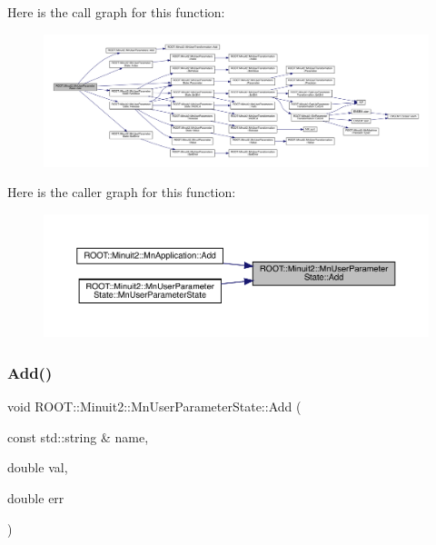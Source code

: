 Here is the call graph for this function\+:\nopagebreak
\begin{figure}[H]
\begin{center}
\leavevmode
\includegraphics[width=350pt]{d3/de0/classROOT_1_1Minuit2_1_1MnUserParameterState_a958abf8c6542ba9be16e298ad2b63001_cgraph}
\end{center}
\end{figure}
Here is the caller graph for this function\+:\nopagebreak
\begin{figure}[H]
\begin{center}
\leavevmode
\includegraphics[width=350pt]{d3/de0/classROOT_1_1Minuit2_1_1MnUserParameterState_a958abf8c6542ba9be16e298ad2b63001_icgraph}
\end{center}
\end{figure}
\mbox{\label{classROOT_1_1Minuit2_1_1MnUserParameterState_a958abf8c6542ba9be16e298ad2b63001}} 
\subsubsection{\texorpdfstring{Add()}{Add()}\hspace{0.1cm}{\footnotesize\ttfamily [2/6]}}
{\footnotesize\ttfamily void R\+O\+O\+T\+::\+Minuit2\+::\+Mn\+User\+Parameter\+State\+::\+Add (\begin{DoxyParamCaption}\item[{const std\+::string \&}]{name,  }\item[{double}]{val,  }\item[{double}]{err }\end{DoxyParamCaption})}

